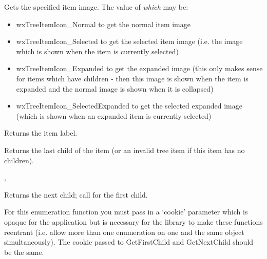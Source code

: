 \label{wxtreectrlgetitemimage}


Gets the specified item image. The value of {\it which} may be:
\begin{itemize}\itemsep=0pt
\item{wxTreeItemIcon\_Normal} to get the normal item image
\item{wxTreeItemIcon\_Selected} to get the selected item image (i.e. the image
which is shown when the item is currently selected)
\item{wxTreeItemIcon\_Expanded} to get the expanded image (this only
makes sense for items which have children - then this image is shown when the
item is expanded and the normal image is shown when it is collapsed)
\item{wxTreeItemIcon\_SelectedExpanded} to get the selected expanded image
(which is shown when an expanded item is currently selected)
\end{itemize}

\label{wxtreectrlgetitemtext}


Returns the item label.

\label{wxtreectrlgetlastchild}


Returns the last child of the item (or an invalid tree item if this item has no children).


,

\label{wxtreectrlgetnextchild}


Returns the next child; call  for the first child.

For this enumeration function you must pass in a `cookie' parameter
which is opaque for the application but is necessary for the library
to make these functions reentrant (i.e. allow more than one
enumeration on one and the same object simultaneously). The cookie passed to
GetFirstChild and GetNextChild should be the same.

